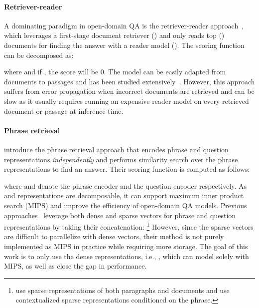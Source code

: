 \documentclass[11pt,a4paper]{article}
\newcommand{\draftonly}[1]{#1}
\renewcommand{\draftonly}[1]{}
\newcommand{\draftcomment}[3]{\draftonly{\textcolor{#2}{{{[#1: #3]}}}}}
\newcommand{\jinhyuk}[1]{\draftcomment{Jinhyuk}{blue}{#1}}
\begin{document}
\paragraph{Retriever-reader}
A dominating paradigm in open-domain QA is the retriever-reader approach~\cite{chen2017reading,lee2019latent,karpukhin2020dense}, which leverages a first-stage document retriever () and only reads top  () documents for finding the answer with a reader model (). The scoring function  can be decomposed as:

where  and if , the score will be 0.
The model can be easily adapted from documents to passages and has been studied extensively~\cite{yang2019end,wang2019multi}.
However, this approach suffers from error propagation when incorrect documents are retrieved and can be slow as it usually requires running an expensive reader model on every retrieved document or passage at inference time.




\begin{comment}
\paragraph{Reader Only}
A second paradigm, the reader only approach~\citep{roberts2020much} (also known as a closed-book models\jinhyuk{add EaE?} merely depends on parameters of language models () to store all the factual knowledge:

This approach requires gigantic language models (e.g., T5 models with 11G parameters) to achieve competitive performance. It is also known that these models perform more question memorization than generalization~\cite{lewis2020question}.
\end{comment}



\paragraph{Phrase retrieval}
\citet{seo2019real} introduce the phrase retrieval approach that encodes phrase and question representations \textit{independently} and performs similarity search over the phrase representations to find an answer.
Their scoring function  is computed as follows:
\vspace{-0.5em}

where  and  denote the phrase encoder and the question encoder respectively.
As  and  representations are decomposable, it can support maximum inner product search (MIPS) and improve the efficiency of open-domain QA models.
Previous approaches~\cite{seo2019real,lee2020contextualized} leverage both dense and sparse vectors for phrase and question representations by taking their concatenation: \footnote{ use sparse representations of both paragraphs and documents  and  use contextualized sparse representations conditioned on the phrase.}
However, since the sparse vectors are difficult to parallelize with dense vectors, their method is not purely implemented as MIPS in practice while requiring more storage.
The goal of this work is to only use the dense representations, i.e., , which can model  solely with MIPS, as well as close the gap in performance.
\end{document}

